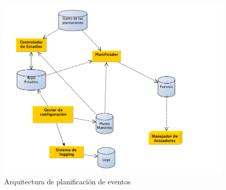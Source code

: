 \begin{figure}[h!]
  \centering
  \includegraphics[width=1\textwidth]{./images/arq_plan.png}
  \caption{Arquitectura de planificación de eventos}
  \label{fig:clases4}
\end{figure}

